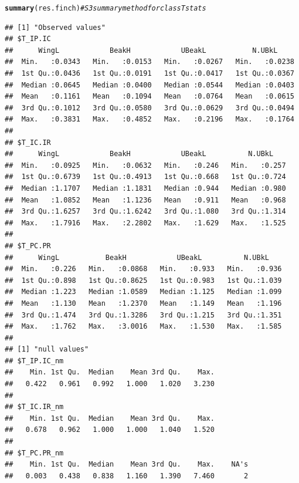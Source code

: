 \documentclass[12pt]{article}\usepackage[]{graphicx}\usepackage[]{color}
\makeatletter
\newcommand{\hlcom}[1]{\textcolor[rgb]{0.678,0.584,0.686}{\textit{#1}}}%
\newcommand{\hlstd}[1]{\textcolor[rgb]{0.345,0.345,0.345}{#1}}%
\newcommand{\hlkwd}[1]{\textcolor[rgb]{0.737,0.353,0.396}{\textbf{#1}}}%
\newenvironment{kframe}{%
 \def\at@end@of@kframe{}%
 \ifinner\ifhmode%
  \def\at@end@of@kframe{\end{minipage}}%
  \begin{minipage}{\columnwidth}%
 \fi\fi%
 \def\FrameCommand##1{\hskip\@totalleftmargin \hskip-\fboxsep
 \colorbox{shadecolor}{##1}\hskip-\fboxsep
     \hskip-\linewidth \hskip-\@totalleftmargin \hskip\columnwidth}%
 \MakeFramed {\advance\hsize-\width
   \@totalleftmargin\z@ \linewidth\hsize
   \@setminipage}}%
 {\par\unskip\endMakeFramed%
 \at@end@of@kframe}
\newenvironment{knitrout}{}{} %
\makeatother
\begin{document}
\newpage

\begin{knitrout}
\color{fgcolor}\begin{kframe}
\begin{alltt}
\hlkwd{summary}\hlstd{(res.finch)} \hlcom{#S3 summary method for class Tstats}
\end{alltt}
\begin{verbatim}
## [1] "Observed values"
## $T_IP.IC
##      WingL            BeakH            UBeakL           N.UBkL      
##  Min.   :0.0343   Min.   :0.0153   Min.   :0.0267   Min.   :0.0238  
##  1st Qu.:0.0436   1st Qu.:0.0191   1st Qu.:0.0417   1st Qu.:0.0367  
##  Median :0.0645   Median :0.0400   Median :0.0544   Median :0.0403  
##  Mean   :0.1161   Mean   :0.1094   Mean   :0.0764   Mean   :0.0615  
##  3rd Qu.:0.1012   3rd Qu.:0.0580   3rd Qu.:0.0629   3rd Qu.:0.0494  
##  Max.   :0.3831   Max.   :0.4852   Max.   :0.2196   Max.   :0.1764  
## 
## $T_IC.IR
##      WingL            BeakH            UBeakL          N.UBkL     
##  Min.   :0.0925   Min.   :0.0632   Min.   :0.246   Min.   :0.257  
##  1st Qu.:0.6739   1st Qu.:0.4913   1st Qu.:0.668   1st Qu.:0.724  
##  Median :1.1707   Median :1.1831   Median :0.944   Median :0.980  
##  Mean   :1.0852   Mean   :1.1236   Mean   :0.911   Mean   :0.968  
##  3rd Qu.:1.6257   3rd Qu.:1.6242   3rd Qu.:1.080   3rd Qu.:1.314  
##  Max.   :1.7916   Max.   :2.2802   Max.   :1.629   Max.   :1.525  
## 
## $T_PC.PR
##      WingL           BeakH            UBeakL          N.UBkL     
##  Min.   :0.226   Min.   :0.0868   Min.   :0.933   Min.   :0.936  
##  1st Qu.:0.898   1st Qu.:0.8625   1st Qu.:0.983   1st Qu.:1.039  
##  Median :1.223   Median :1.0589   Median :1.125   Median :1.099  
##  Mean   :1.130   Mean   :1.2370   Mean   :1.149   Mean   :1.196  
##  3rd Qu.:1.474   3rd Qu.:1.3286   3rd Qu.:1.215   3rd Qu.:1.351  
##  Max.   :1.762   Max.   :3.0016   Max.   :1.530   Max.   :1.585  
## 
## [1] "null values"
## $T_IP.IC_nm
##    Min. 1st Qu.  Median    Mean 3rd Qu.    Max. 
##   0.422   0.961   0.992   1.000   1.020   3.230 
## 
## $T_IC.IR_nm
##    Min. 1st Qu.  Median    Mean 3rd Qu.    Max. 
##   0.678   0.962   1.000   1.000   1.040   1.520 
## 
## $T_PC.PR_nm
##    Min. 1st Qu.  Median    Mean 3rd Qu.    Max.    NA's 
##   0.003   0.438   0.838   1.160   1.390   7.460       2
\end{verbatim}
\end{kframe}
\end{knitrout}
\end{document}
